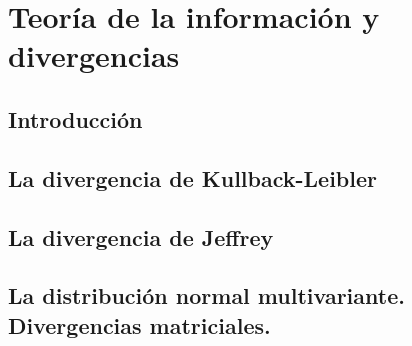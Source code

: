 \chapter{Teoría de la información y divergencias}


\section{Introducción}

\section{La divergencia de Kullback-Leibler}

\section{La divergencia de Jeffrey}

\section{La distribución normal multivariante. Divergencias matriciales.}